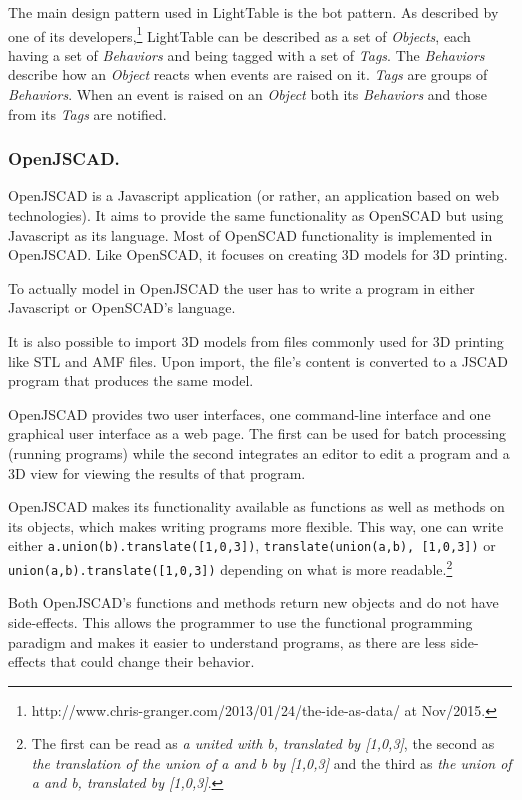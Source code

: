 \documentclass{./llncs2e/llncs}
\begin{document}
	The main design pattern used in LightTable is the \ac{bot} pattern. 
	As described by one of its developers,\footnote{http://www.chris-granger.com/2013/01/24/the-ide-as-data/ at Nov/2015.} LightTable can be described as a set of \emph{Objects}, each having a set of \emph{Behaviors} and being tagged with a set of \emph{Tags}. 
	The \emph{Behaviors} describe how an \emph{Object} reacts when events are raised on it. \emph{Tags} are groups of \emph{Behaviors}. 
	When an event is raised on an \emph{Object} both its \emph{Behaviors} and those from its \emph{Tags} are notified.

\subsubsection{OpenJSCAD.}
	OpenJSCAD\cite{openjscad2015site} is a Javascript application (or rather, an application based on web technologies).
	It aims to provide the same functionality as OpenSCAD\cite{kintel2011openscad} but using Javascript as its language. 
	Most of OpenSCAD functionality is implemented in OpenJSCAD. 
	Like OpenSCAD, it focuses on creating 3D models for 3D printing.

	To actually model in OpenJSCAD the user has to write a program in either Javascript or OpenSCAD's language.

	It is also possible to import 3D models from files commonly used for 3D printing like STL and AMF files.
	Upon import, the file's content is converted to a JSCAD program that produces the same model. 

	OpenJSCAD provides two user interfaces, one command-line interface and one graphical user interface as a web page.
	The first can be used for batch processing (running programs) while the second integrates an editor to edit a program and a 3D view for viewing the results of that program.

	OpenJSCAD makes its functionality available as functions as well as methods on its objects, which makes writing programs more flexible.
	This way, one can write either \lstinline|a.union(b).translate([1,0,3])|, \lstinline|translate(union(a,b), [1,0,3])| or \lstinline|union(a,b).translate([1,0,3])| depending on what is more readable.\footnote{The first can be read as \emph{a united with b, translated by [1,0,3]}, the second as \emph{the translation of the union of a and b by [1,0,3]} and the third as \emph{the union of a and b, translated by [1,0,3]}.}
	
	Both OpenJSCAD's functions and methods return new objects and do not have side-effects. 
	This allows the programmer to use the functional programming paradigm and makes it easier to understand programs, as there are less side-effects that could change their behavior.
\end{document}
